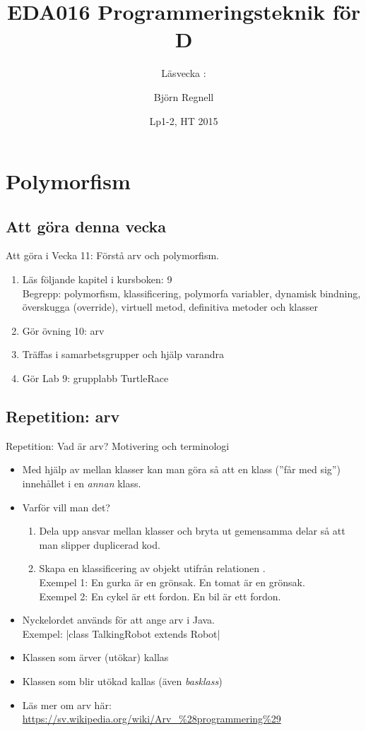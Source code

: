 \documentclass{lecturenotes}
\title[Föreläsningsanteckningar EDA016, 2015]{EDA016 Programmeringsteknik för D}
\subtitle{Läsvecka \vecka: \tema}
\author{Björn Regnell}
\institute{Datavetenskap, LTH}
\date{Lp1-2, HT 2015}
\renewcommand{\vecka}{11}
\newcommand{\tema}{Polymorfism}
\begin{document}
\frame{\titlepage}
\setnextsection{\vecka}
\section[Vecka \vecka: \tema]{\tema}
\frame{\tableofcontents}

\subsection{Att göra denna vecka}
\begin{Slide}{Att göra i Vecka \vecka: Förstå arv och polymorfism.}
\begin{enumerate}
\item Läs följande kapitel i kursboken:  9 \\  
Begrepp: polymorfism, klassificering, polymorfa variabler, dynamisk bindning, överskugga (override), virtuell metod, definitiva metoder och klasser
\item Gör övning 10: arv
\item Träffas i samarbetsgrupper och hjälp varandra 
\item Gör Lab 9: grupplabb TurtleRace
\end{enumerate}
\end{Slide}


\subsection{Repetition: arv}
\begin{Slide}{Repetition: Vad är arv? Motivering och terminologi}\footnotesize
\begin{itemize}
\item Med hjälp av  mellan klasser kan man göra så att en klass  (''får med sig'') innehållet i en \textit{annan} klass.
\item Varför vill man det? 
\begin{enumerate}\footnotesize
\item Dela upp ansvar mellan klasser och bryta ut gemensamma delar så att man slipper duplicerad kod.
\item Skapa en klassificering av objekt utifrån relationen  .  \\ Exempel 1: En gurka är en grönsak. En tomat är en grönsak. \\ Exempel 2: En cykel är ett fordon. En bil är ett fordon. 
\end{enumerate}
\item Nyckelordet  används för att ange arv i Java. \\ Exempel:   \code|class TalkingRobot extends Robot|
\item Klassen som ärver (utökar) kallas 
\item Klassen som blir utökad kallas  (även \textit{basklass})
\item Läs mer om arv  här: \scriptsize \url{https://sv.wikipedia.org/wiki/Arv\_\%28programmering\%29} 
\end{itemize}
\end{Slide}
\end{document}
